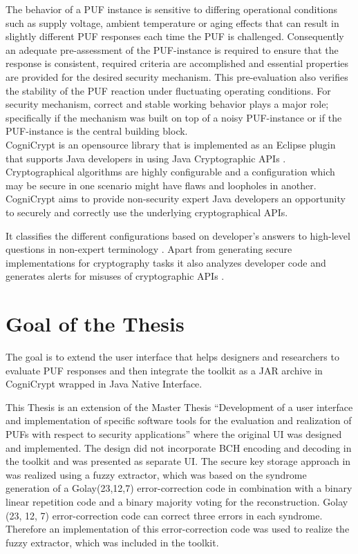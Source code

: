 The behavior of a PUF instance is sensitive to differing operational conditions such as supply voltage, ambient temperature or aging effects that can result in slightly different PUF responses each time the PUF is challenged. Consequently an adequate pre-assessment of the PUF-instance is required to ensure that the response is consistent, required criteria are accomplished and essential properties are provided for the desired security mechanism. This pre-evaluation also verifies the stability of
the PUF reaction under fluctuating operating conditions. For security mechanism, correct and stable working behavior plays a major role; specifically if the mechanism was built on top of a noisy PUF-instance or if the PUF-instance is the central building block.\\

CogniCrypt is an opensource library that is implemented as an Eclipse plugin that supports Java developers in using Java Cryptographic APIs \cite{cogni}. Cryptographical algorithms are highly configurable and a configuration which may be secure in one scenario might have flaws and loopholes in another. CogniCrypt aims to provide non-security expert Java developers an opportunity to securely and correctly use the underlying cryptographical APIs.

It classifies the different configurations based on developer's answers to high-level questions in non-expert terminology \cite{onward2015}. Apart from generating secure implementations for cryptography tasks it also analyzes developer code and generates alerts for misuses of cryptographic APIs \cite{cogni}. 


\section{Goal of the Thesis}
The goal is to extend the user interface that helps designers and researchers to evaluate PUF responses  and then integrate the toolkit as a JAR archive in CogniCrypt wrapped in Java Native Interface.

This Thesis is an extension of the Master Thesis ``Development of a user interface and implementation of specific software tools for the evaluation and realization of PUFs with respect to security applications''\cite{71} where the original UI was designed and implemented. The design did not incorporate BCH encoding and decoding in the toolkit and was presented as separate UI. The secure key storage approach in \cite{10} was realized using a fuzzy extractor, which was based on the syndrome
generation of a Golay(23,12,7) error-correction code in combination with a binary linear repetition code and a binary majority voting for the reconstruction\cite{71}. Golay (23, 12, 7) error-correction code can correct three errors in each syndrome. Therefore an implementation of this error-correction code was used to realize the fuzzy extractor, which was included in the toolkit.

